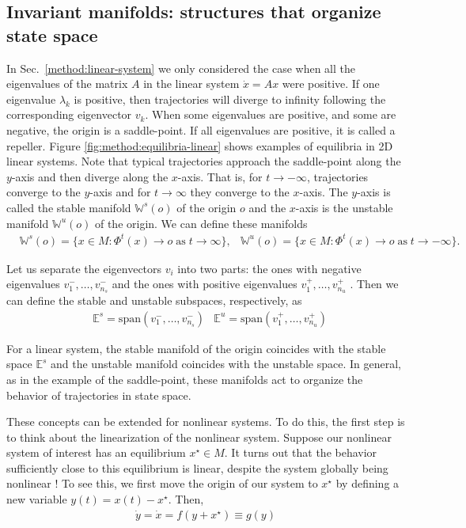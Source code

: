 \subsection{Invariant manifolds: structures that organize state space}

In Sec.~\ref{method:linear-system} we only considered the case when all the eigenvalues of the matrix $A$ in the linear system $\dot{x} = A x$ were positive. If one eigenvalue $\lambda_k$ is positive, then trajectories will diverge to infinity following the corresponding eigenvector $v_k$. When some eigenvalues are positive, and some are negative, the origin is a saddle-point. If all eigenvalues are positive, it is called a repeller.
Figure \ref{fig:method:equilibria-linear} shows examples of equilibria in 2D linear systems. Note that typical trajectories approach the saddle-point along the $y$-axis and then diverge along the $x$-axis. That is, for $t \to -\infty$, trajectories converge to the $y$-axis and for $t \to \infty$ they converge to the $x$-axis. The $y$-axis is called the stable manifold $\mathbb{W}^s(o)$ of the origin $o$ and the $x$-axis is the unstable manifold $\mathbb{W}^u(o)$ of the origin. We can define these manifolds
\begin{align}
&\mathbb{W}^s(o) = \{x \in M: \Phi^t(x) \to o \;\mathrm{as}\; t\to\infty\}, 
&\mathbb{W}^u(o) = \{x \in M: \Phi^t(x) \to o \;\mathrm{as }\; t\to -\infty\}.
\end{align}

Let us separate the eigenvectors $v_i$ into two parts: the ones with negative eigenvalues $v^-_1, \ldots, v^-_{n_s}$ and the ones with positive eigenvalues $v^+_1, \ldots, v^+_{n_u}$ . Then we can define the stable and unstable subspaces, respectively, as 
%
\begin{align}
    &\mathbb{E}^s = \mathrm{span}(v^-_1, \ldots, v^-_{n_s})
    &\mathbb{E}^u = \mathrm{span}(v^+_1, \ldots, v^+_{n_u})
\end{align}

For a linear system, the stable manifold of the origin coincides with the stable space $\mathbb{E}^s$ and the unstable manifold coincides with the unstable space.  In general, as in the example of the saddle-point, these manifolds act to organize the behavior of trajectories in state space.


These concepts can be extended for nonlinear systems. To do this, the first step is to think about the linearization of the nonlinear system. Suppose our nonlinear system of interest has an equilibrium $x^\star \in M$. It turns out that the behavior sufficiently close to this equilibrium is linear, despite the system globally being nonlinear \cite{saletan, glendinning}! To see this, we first move the origin of our system to $x^\star$ by defining a new variable $y(t) = x(t) - x^\star$. Then, 
%
\begin{align}
    \dot{y} = \dot{x} = f(y+x^\star) \equiv g(y)
\end{align}

